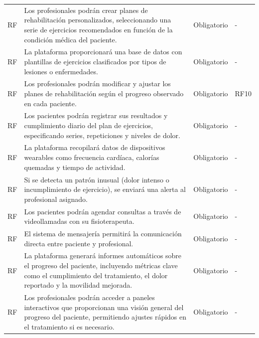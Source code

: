 \documentclass{article}
\begin{document}
\begin{longtable}{@{} p{2.5cm} p{6.5cm} p{3cm} p{3cm} @{}}
	RF\therequisitosFuncionales & Los profesionales podrán crear planes de rehabilitación personalizados, seleccionando una serie de ejercicios recomendados en función de la condición médica del paciente. & Obligatorio & - \\ 
	\addlinespace \stepcounter{requisitosFuncionales}

	RF\therequisitosFuncionales & La plataforma proporcionará una base de datos con plantillas de ejercicios clasificados por tipos de lesiones o enfermedades. & Obligatorio & - \\ 
	\addlinespace \stepcounter{requisitosFuncionales}

	RF\therequisitosFuncionales & Los profesionales podrán modificar y ajustar los planes de rehabilitación según el progreso observado en cada paciente. & Obligatorio & RF10 \\ 
	\addlinespace \stepcounter{requisitosFuncionales}
	RF\therequisitosFuncionales & Los pacientes podrán registrar sus resultados y cumplimiento diario del plan de ejercicios, especificando series, repeticiones y niveles de dolor. & Obligatorio & - \\
	\addlinespace \stepcounter{requisitosFuncionales}
	RF\therequisitosFuncionales & La plataforma recopilará datos de dispositivos wearables como frecuencia cardíaca, calorías quemadas y tiempo de actividad. & Obligatorio & - \\
	\addlinespace \stepcounter{requisitosFuncionales}
	RF\therequisitosFuncionales & Si se detecta un patrón inusual (dolor intenso o incumplimiento de ejercicio), se enviará una alerta al profesional asignado. & Obligatorio & - \\
	\addlinespace \stepcounter{requisitosFuncionales}
	RF\therequisitosFuncionales & Los pacientes podrán agendar consultas a través de videollamadas con su fisioterapeuta. & Obligatorio & - \\
	\addlinespace \stepcounter{requisitosFuncionales}
	RF\therequisitosFuncionales & El sistema de mensajería permitirá la comunicación directa entre paciente y profesional. & Obligatorio & - \\
	\addlinespace \stepcounter{requisitosFuncionales}
	RF\therequisitosFuncionales & La plataforma generará informes automáticos sobre el progreso del paciente, incluyendo métricas clave como el cumplimiento del tratamiento, el dolor reportado y la movilidad mejorada. & Obligatorio & - \\
	\addlinespace \stepcounter{requisitosFuncionales}
	RF\therequisitosFuncionales & Los profesionales podrán acceder a paneles interactivos que proporcionan una visión general del progreso del paciente, permitiendo ajustes rápidos en el tratamiento si es necesario. & Obligatorio & - \\
	\bottomrule
\end{longtable}
\end{document}
